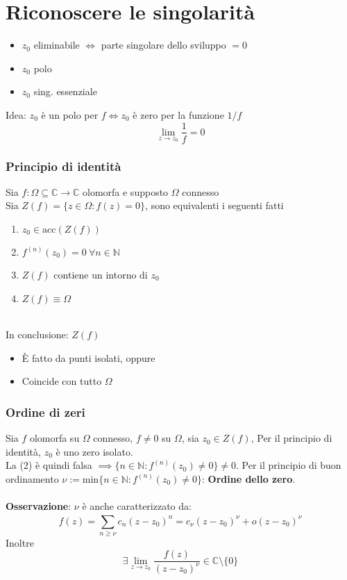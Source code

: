 \documentclass[a4paper]{article}
\newcommand{\N}{\mathbb{N}}
\newcommand{\C}{\mathbb{C}}
\begin{document}
\section{Riconoscere le singolarità}
\begin{itemize}
	\item $z_0$ eliminabile $\iff$ parte singolare dello sviluppo $=0$
	\item $z_0$ polo 
	\item $z_0$ sing. essenziale 
\end{itemize}
Idea: $z_0$ è un polo per $f\iff z_0 $ è zero per la funzione $1/f$
\[\lim_{z \to z_0} \frac{1}{f}=0\]
\subsubsection{Principio di identità}
Sia $f:\Omega \subseteq  \C\to \C$ olomorfa e supposto $\Omega$ connesso
\\Sia $Z(f)=\{z\in\Omega : f(z)=0\} $, sono equivalenti i seguenti fatti
\begin{enumerate}
	
	\item $z_0\in \text{acc}(Z(f))$
	\item $f^{(n)}(z_0)=0\ \forall n\in\N$
	\item $Z(f)$ contiene un intorno di $z_0$
	\item $Z(f)\equiv\Omega$
\end{enumerate}
\\In conclusione: $Z(f)$
\begin{itemize}
	\item È fatto da punti isolati, oppure 
	\item Coincide con tutto $\Omega$ 
\end{itemize}
\subsubsection{Ordine di zeri}
Sia $f$ olomorfa su $\Omega$ connesso, $f\neq 0$ su $\Omega$, sia $z_0\in Z(f)$, Per il principio di identità, $z_0$ è uno zero isolato.
\\La (2) è quindi falsa $\implies \{n\in\N: f^{(n)}(z_0)\neq 0\} \neq 0$. Per il principio di buon ordinamento $\nu := \text{min}\{n\in\N: f^{(n)}(z_0)\neq 0\} $: \textbf{Ordine dello zero}.\\
\\\textbf{Osservazione}: $\nu$ è anche caratterizzato da:
\[f(z)=\sum_{n\ge \nu}^{} c_n(z-z_0)^n=c_\nu(z-z_0)^\nu+o(z-z_0)^\nu\]
Inoltre
\[\exists \lim_{z \to z_0} \frac{f(z)}{(z-z_0)^\nu}\in\C\setminus \{0\} \]
\end{document}
